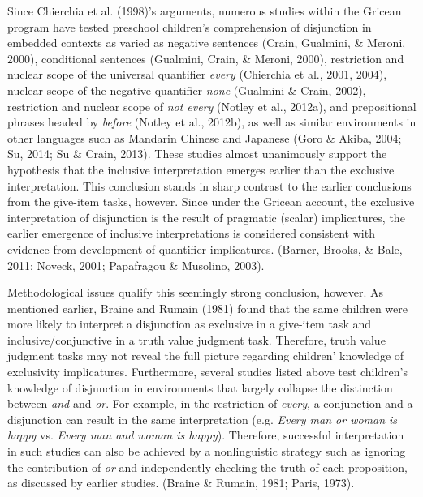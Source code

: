 \documentclass[,man,floatsintext]{apa6}
\begin{document}
Since Chierchia et al. (1998)'s arguments, numerous studies within the Gricean program have tested preschool children's comprehension of disjunction in embedded contexts as varied as negative sentences (Crain, Gualmini, \& Meroni, 2000), conditional sentences (Gualmini, Crain, \& Meroni, 2000), restriction and nuclear scope of the universal quantifier \emph{every} (Chierchia et al., 2001, 2004), nuclear scope of the negative quantifier \emph{none} (Gualmini \& Crain, 2002), restriction and nuclear scope of \emph{not every} (Notley et al., 2012a), and prepositional phrases headed by \emph{before} (Notley et al., 2012b), as well as similar environments in other languages such as Mandarin Chinese and Japanese (Goro \& Akiba, 2004; Su, 2014; Su \& Crain, 2013). These studies almost unanimously support the hypothesis that the inclusive interpretation emerges earlier than the exclusive interpretation. This conclusion stands in sharp contrast to the earlier conclusions from the give-item tasks, however. Since under the Gricean account, the exclusive interpretation of disjunction is the result of pragmatic (scalar) implicatures, the earlier emergence of inclusive interpretations is considered consistent with evidence from development of quantifier implicatures. (Barner, Brooks, \& Bale, 2011; Noveck, 2001; Papafragou \& Musolino, 2003).

Methodological issues qualify this seemingly strong conclusion, however. As mentioned earlier, Braine and Rumain (1981) found that the same children were more likely to interpret a disjunction as exclusive in a give-item task and inclusive/conjunctive in a truth value judgment task. Therefore, truth value judgment tasks may not reveal the full picture regarding children' knowledge of exclusivity implicatures. Furthermore, several studies listed above test children's knowledge of disjunction in environments that largely collapse the distinction between \emph{and} and \emph{or}. For example, in the restriction of \emph{every}, a conjunction and a disjunction can result in the same interpretation (e.g. \emph{Every man or woman is happy} vs. \emph{Every man and woman is happy}). Therefore, successful interpretation in such studies can also be achieved by a nonlinguistic strategy such as ignoring the contribution of \emph{or} and independently checking the truth of each proposition, as discussed by earlier studies. (Braine \& Rumain, 1981; Paris, 1973).
\end{document}
